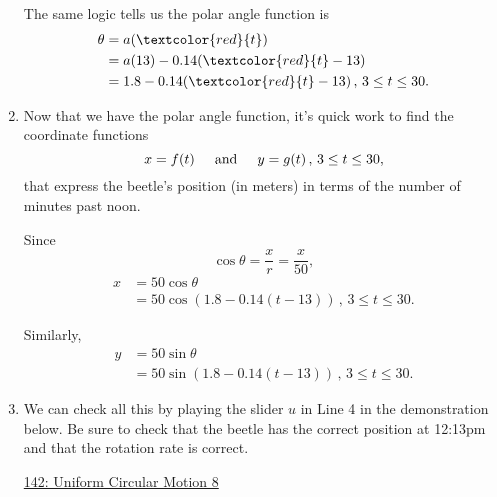 \documentclass{ximera}
\begin{document}
\begin{question}
\begin{explanation}
\begin{enumerate}
The same logic tells us the polar angle function is
\begin{align*}
 \theta &= a(\textcolor{red}{t}) \\
           &=   a(13) - 0.14(\textcolor{red}{t} - 13)   \\
            &= 1.8  - 0.14(\textcolor{red}{t} - 13)   \, , \, 3\leq t \leq 30 .
\end{align*}

\item Now that we have the polar angle function, it's quick work to find the coordinate functions 
\[
       x = f(t) \hskip 0.2in  \text{and} \hskip 0.2in  y=g(t) \, , \, 3\leq t \leq 30 ,
\] 
that express the beetle's position (in meters) in terms of the number of minutes past noon.

Since 
\[
    \cos\theta = \frac{x}{r} = \frac{x}{50} ,
\]
\begin{align*}
    x        &= 50\cos\theta \\
       &= 50\cos \left( 1.8  - 0.14(t - 13) \right)  \, , \, 3\leq t \leq 30  .
\end{align*}

Similarly,
\begin{align*}
    y        &= 50\sin\theta \\
       &= 50\sin \left( 1.8  - 0.14(t - 13) \right)  \, , \, 3\leq t \leq 30  .
\end{align*}

\item We can check all this by playing the slider $u$ in Line 4 in the demonstration below. Be sure to check that the beetle has the correct position at 12:13pm and that the rotation rate is correct.

\begin{onlineOnly}
    \begin{center}
\end{center}
\end{onlineOnly}

\href{https://www.desmos.com/calculator/swkzufaisr}{142: Uniform Circular Motion 8}


\end{enumerate}
\end{explanation}


\end{question}
\end{document}
